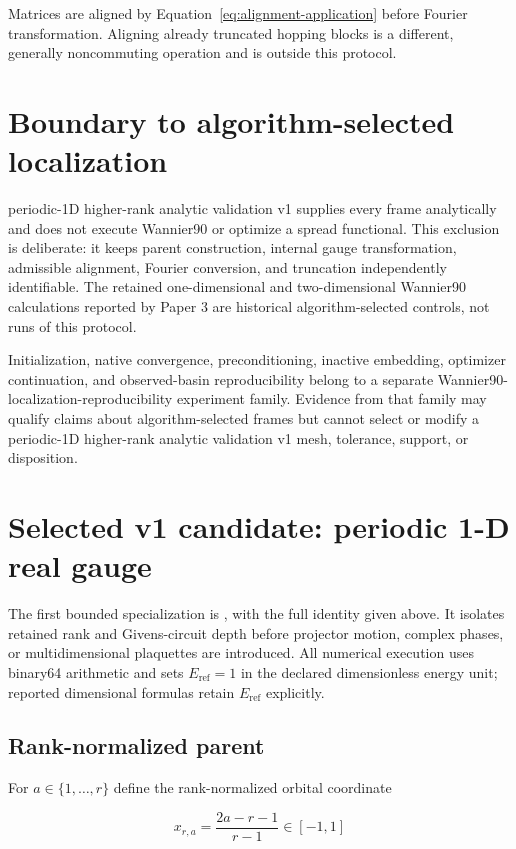 \documentclass[11pt]{article}
\begin{document}
Matrices are aligned by Equation~\eqref{eq:alignment-application} before Fourier
transformation. Aligning already truncated hopping blocks is a different, generally
noncommuting operation and is outside this protocol.

\section{Boundary to algorithm-selected localization}

periodic-1D higher-rank analytic validation v1 supplies every frame analytically and does not execute Wannier90 or optimize a
spread functional. This exclusion is deliberate: it keeps parent construction, internal
gauge transformation, admissible alignment, Fourier conversion, and truncation independently
identifiable. The retained one-dimensional and two-dimensional Wannier90 calculations
reported by Paper 3 are historical algorithm-selected controls, not runs of this
protocol.

Initialization, native convergence, preconditioning, inactive embedding, optimizer
continuation, and observed-basin reproducibility belong to a separate
Wannier90-localization-reproducibility experiment family. Evidence from that family may
qualify claims about algorithm-selected frames but cannot select or modify a periodic-1D higher-rank analytic validation v1 mesh,
tolerance, support, or disposition.

\section{Selected v1 candidate: periodic 1-D real gauge}

The first bounded specialization is , with the full identity given
above. It isolates retained rank and Givens-circuit depth before projector motion,
complex phases, or multidimensional plaquettes are introduced. All numerical execution
uses binary64 arithmetic and sets $E_{\mathrm{ref}}=1$ in the declared dimensionless
energy unit; reported dimensional formulas retain $E_{\mathrm{ref}}$ explicitly.

\subsection{Rank-normalized parent}

For $a\in\{1,\ldots,r\}$ define the rank-normalized orbital coordinate

\[
x_{r,a}=\frac{2a-r-1}{r-1}\in[-1,1]
\]
\end{document}
